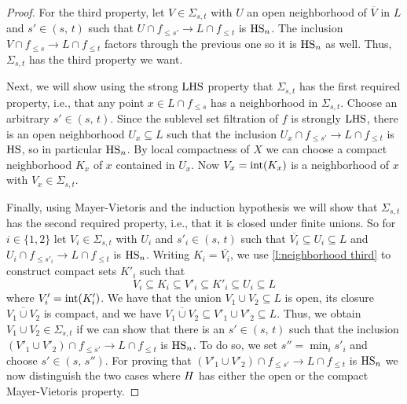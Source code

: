 \begin{proof}
	For the third property, let $V \in \Sigma_{s,t}$ with $U$ an open neighborhood of $\overline{V}$ in $L$ and $s' \in (s,\, t)$ such that 
	$U \cap f_{\leq s'} \to L \cap f_{\leq t}$
	is $\mathrm{HS}_n$.
	The inclusion
	$V \cap f_{\leq s} \to L \cap f_{\leq t}$
	factors through the previous one so it is $\mathrm{HS}_n$ as well.
	Thus, $\Sigma_{s, t}$ has the third property we want.
	
	Next, we will show using the strong $\mathrm{LHS}$ property that $\Sigma_{s, t}$ has the first required property, i.e., that any point $x \in L \cap f_{\leq s}$ has a neighborhood in $\Sigma_{s, t}$.
	Choose an arbitrary $s' \in (s,\, t)$.
	Since the sublevel set filtration of $f$ is strongly $\mathrm{LHS}$, there is an open neighborhood $U_x \subseteq L$ such that the inclusion
	$U_x \cap f_{\leq s'} \to L \cap f_{\leq t}$
	is $\mathrm{HS}$, so in particular $\mathrm{HS}_n$.
	By local compactness of $X$ we can choose a compact neighborhood $K_x$ of $x$ contained in $U_x$.
	Now $V_x = \operatorname{int} (K_x)$ is a neighborhood of $x$ with $V_x \in \Sigma_{s,t}$.
	
	Finally, using Mayer-Vietoris and the induction hypothesis we will show that $\Sigma_{s,t}$ has the second required property, i.e., that it is closed under finite unions.
	So for $i \in \{1, 2\}$ let $V_i \in \Sigma_{s,t}$ with $U_i$ and $s'_i \in (s,\, t)$ such that 
	$\overline{V_i} \subseteq U_i \subseteq L$ 
	and
	$U_{i} \cap f_{\leq s'_i} \to L \cap f_{\leq t}$
	is $\mathrm{HS}_n$.
	Writing $K_i = \overline{V_i}$, we use \cref{l:neighborhood third} to construct compact sets $K'_i$ such that
	\begin{equation*}
	V_i \subseteq K_i \subseteq V'_i \subseteq K'_i \subseteq U_i \subseteq L
	\end{equation*}
	where $V'_i = \operatorname{int}(K'_i)$.
	We have that the union $V_1 \cup V_2 \subseteq L$ is open, its closure $\overline{V_1 \cup V_2}$ is compact, and we have $\overline{V_1 \cup V_2} \subseteq V'_1 \cup V'_2 \subseteq L$.
	Thus, we obtain $V_1 \cup V_2 \in \Sigma_{s,t}$ if we can show that there is an $s' \in (s,\, t)$ such that the inclusion 
	$\left(V'_1 \cup V'_2 \right) \cap f_{\leq s'} \to L \cap f_{\leq t}$
	is $\mathrm{HS}_n$.
	To do so, we set $s'' = \min_i s'_i$ and choose $s' \in (s,\, s'')$.
	For proving that $\left(V'_1 \cup V'_2 \right) \cap f_{\leq s'} \to L \cap f_{\leq t}$ is $\mathrm{HS}_n$ we now distinguish the two cases where $H$ has either the open or the compact Mayer-Vietoris property.
	

\end{proof}
